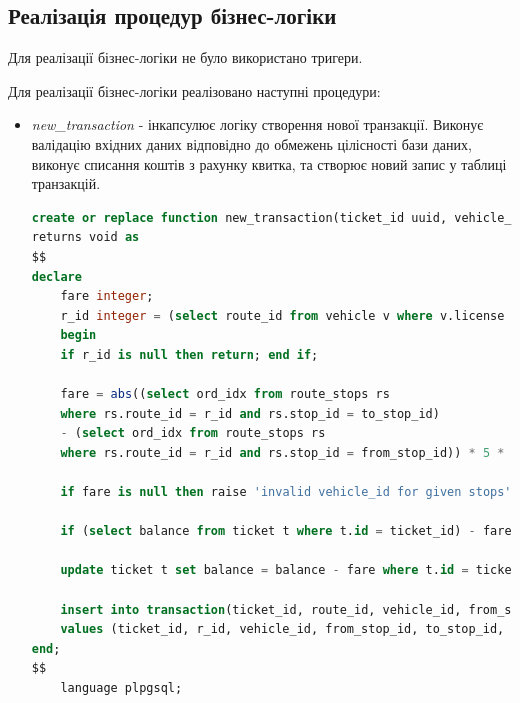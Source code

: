\documentclass[oneside,14pt]{extarticle}
\begin{document}
\subsection{Реалізація процедур бізнес-логіки}
Для реалізації бізнес-логіки не було використано тригери.

Для реалізації бізнес-логіки реалізовано наступні процедури:
\begin{itemize}
\item \textit{new\_transaction} - інкапсулює логіку створення нової транзакції. Виконує валідацію вхідних даних відповідно до обмежень цілісності бази даних, виконує списання коштів з рахунку квитка, та створює новий запис у таблиці транзакцій.
{\fontsize{8pt}{8pt}\selectfont\begin{lstlisting}[language=sql]
create or replace function new_transaction(ticket_id uuid, vehicle_id character varying(16), from_stop_id integer, to_stop_id integer)
returns void as
$$
declare
	fare integer;
	r_id integer = (select route_id from vehicle v where v.license = vehicle_id);
	begin
	if r_id is null then return; end if;

	fare = abs((select ord_idx from route_stops rs
	where rs.route_id = r_id and rs.stop_id = to_stop_id)
	- (select ord_idx from route_stops rs
	where rs.route_id = r_id and rs.stop_id = from_stop_id)) * 5 * coalesce((select mult from ticket_discount_mult d where d.discount = (select discount from ticket t where t.id = ticket_id)), 1);
	
	if fare is null then raise 'invalid vehicle_id for given stops'; end if;
	
	if (select balance from ticket t where t.id = ticket_id) - fare < 0 then raise 'not enough balance'; end if;
	
	update ticket t set balance = balance - fare where t.id = ticket_id;

	insert into transaction(ticket_id, route_id, vehicle_id, from_stop_id, to_stop_id, fare, timestamp)
	values (ticket_id, r_id, vehicle_id, from_stop_id, to_stop_id, fare, now());
end;
$$
	language plpgsql;
\end{lstlisting}}
\end{itemize}
\end{document}
